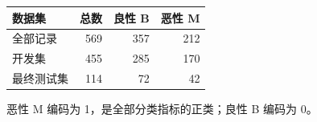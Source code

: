\begin{center}
\small
\setlength{\tabcolsep}{5pt}
\renewcommand{\arraystretch}{1.25}
\begin{tabular}{lrrr}
\toprule
数据集 & 总数 & 良性 B & 恶性 M \tabularnewline
\midrule
全部记录 & 569 & 357 & 212 \tabularnewline
开发集 & 455 & 285 & 170 \tabularnewline
最终测试集 & 114 & 72 & 42 \tabularnewline
\bottomrule
\end{tabular}
\end{center}
{\footnotesize 恶性 M 编码为 1，是全部分类指标的正类；良性 B 编码为 0。}
